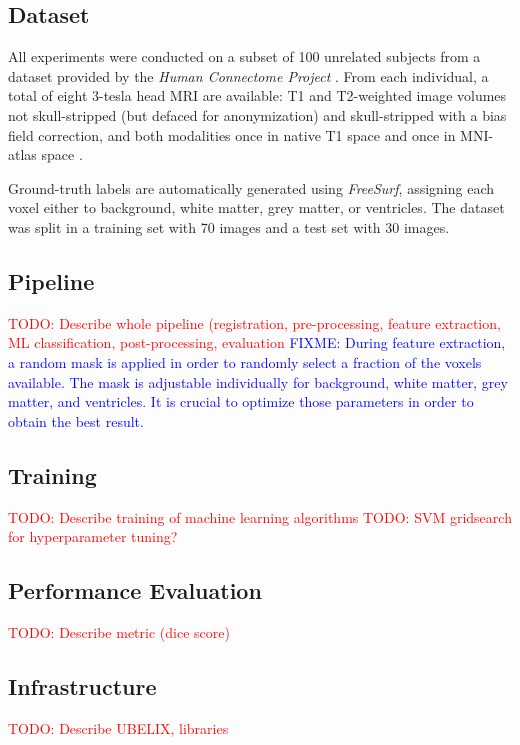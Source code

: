 \documentclass[journal]{IEEEtran}
\newcommand\TODO[1]{\textcolor{red}{TODO: #1}}
\newcommand\FIXME[1]{\textcolor{blue}{FIXME: #1}}
\begin{document}
\subsection{Dataset}
All experiments were conducted on a subset of 100 unrelated subjects from a dataset provided by the \textit{Human Connectome Project} \cite{van2013wu}. From each individual, a total of eight 3-tesla head MRI are available: T1 and T2-weighted image volumes not skull-stripped (but defaced for anonymization) and skull-stripped with a bias field correction, and both modalities once in native T1 space and once in MNI-atlas space \cite{mazziotta2001probabilistic}.

Ground-truth labels are automatically generated using \textit{FreeSurf}, assigning each voxel either to background, white matter, grey matter, or ventricles. The dataset was split in a training set with 70 images and a test set with 30 images.
\subsection{Pipeline}
\TODO{Describe whole pipeline (registration, pre-processing, feature extraction, ML classification, post-processing, evaluation}
\FIXME{During feature extraction, a random mask is applied in order to randomly select a fraction of the voxels available. The mask is adjustable individually for background, white matter, grey matter, and ventricles. It is crucial to optimize those parameters in order to obtain the best result.}

\subsection{Training}
\TODO{Describe training of machine learning algorithms}
\TODO{SVM gridsearch for hyperparameter tuning?}

\subsection{Performance Evaluation}
\TODO{Describe metric (dice score)}

\subsection{Infrastructure}
\TODO{Describe UBELIX, libraries}
\end{document}
